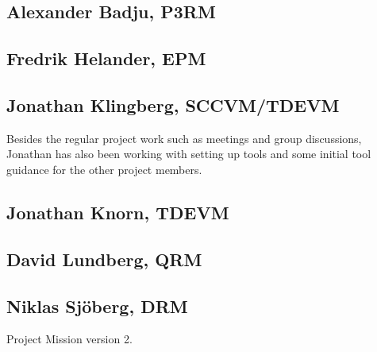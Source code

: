 \documentclass[10pt]{article}
\begin{document}
\subsection{Alexander Badju, P3RM}
\subsection{Fredrik Helander, EPM}
\subsection{Jonathan Klingberg, SCCVM/TDEVM}
Besides the regular project work such as meetings and group discussions, Jonathan has also been working with setting up tools and some initial tool guidance for the other project members.
\subsection{Jonathan Knorn, TDEVM}
\subsection{David Lundberg, QRM}
\subsection{Niklas Sjöberg, DRM}

\begin{thebibliography}{1}
 Project Mission version 2. 

\end{thebibliography}
\end{document}
